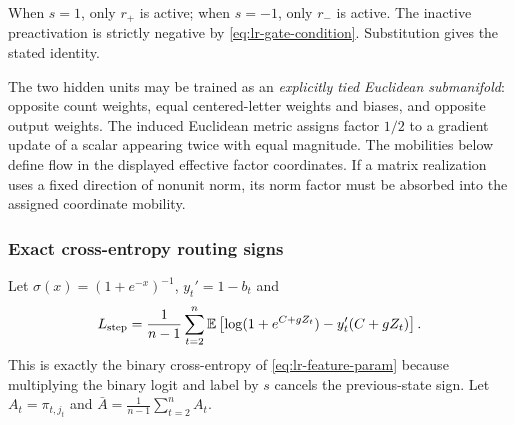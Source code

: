 When $s=1$, only $r_+$ is active; when $s=-1$, only $r_-$ is active.
The inactive preactivation is strictly negative by
\eqref{eq:lr-gate-condition}.  Substitution gives the stated identity.

The two hidden units may be trained as an \emph{explicitly tied Euclidean
submanifold}: opposite count weights, equal centered-letter weights and
biases, and opposite output weights.  The induced Euclidean metric assigns
factor $1/2$ to a gradient update of a scalar appearing twice with equal
magnitude.  The mobilities below define flow in the displayed effective factor coordinates.
If a matrix realization uses a fixed direction of nonunit norm, its norm
factor must be absorbed into the assigned coordinate mobility.

\subsubsection{Exact cross-entropy routing signs}
\label{app:weak-routing-signs}

Let $\sigma(x)=(1+e^{-x})^{-1}$, $y_t'=1-b_t$ and
\begin{equation}\label{eq:lr-logistic-risk}
 L_{\mathrm{step}}=\frac1{n-1}\sum_{t=2}^n\mathbb E
 \left[\log(1+e^{C+gZ_t})-y_t'(C+gZ_t)\right].
\end{equation}
This is exactly the binary cross-entropy of
\eqref{eq:lr-feature-param} because multiplying the binary logit and
label by $s$ cancels the previous-state sign.
Let $A_t=\pi_{t,j_t}$ and $\bar A=\frac1{n-1}\sum_{t=2}^n A_t$.

